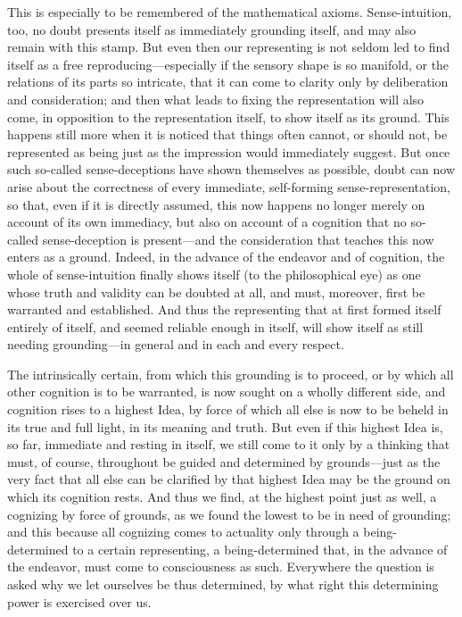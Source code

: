\documentclass[12pt,a4paper]{book}
\begin{document}
This is especially to be remembered of the mathematical axioms. Sense-intuition,
too, no doubt presents itself as immediately grounding itself, and may also
remain with this stamp. But even then our representing is not seldom led to find
itself as a free reproducing---especially if the sensory shape is so manifold, or
the relations of its parts so intricate, that it can come to clarity only by
deliberation and consideration; and then what leads to fixing the representation
will also come, in opposition to the representation itself, to show itself as its
ground. This happens still more when it is noticed that things often cannot, or
should not, be represented as being just as the impression would immediately
suggest. But once such so-called sense-deceptions have shown themselves as
possible, doubt can now arise about the correctness of every immediate,
self-forming sense-representation, so that, even if it is directly assumed, this
now happens no longer merely on account of its own immediacy, but also on account
of a cognition that no so-called sense-deception is present---and the
consideration that teaches this now enters as a ground. Indeed, in the advance of
the endeavor and of cognition, the whole of sense-intuition finally shows itself
(to the philosophical eye) as one whose truth and validity can be doubted at all,
and must, moreover, first be warranted and established. And thus the representing
that at first formed itself entirely of itself, and seemed reliable enough in
itself, will show itself as still needing grounding---in general and in each and
every respect.

The intrinsically certain, from which this grounding is to proceed, or by which
all other cognition is to be warranted, is now sought on a wholly different side,
and cognition rises to a highest Idea, by force of which all else is now to be
beheld in its true and full light, in its meaning and truth. But even if this
highest Idea is, so far, immediate and resting in itself, we still come to it only
by a thinking that must, of course, throughout be guided and determined by
grounds---just as the very fact that all else can be clarified by that highest
Idea may be the ground on which its cognition rests. And thus we find, at the
highest point just as well, a cognizing by force of grounds, as we found the
lowest to be in need of grounding; and this because all cognizing comes to
actuality only through a being-determined to a certain representing, a
being-determined that, in the advance of the endeavor, must come to consciousness
as such. Everywhere the question is asked why we let ourselves be thus
determined, by what right this determining power is exercised over us.
\end{document}
